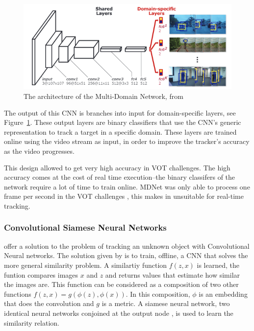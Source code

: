  \begin{figure}[!ht]
    \centering
    \includegraphics[scale=0.5]{MDNet.png}
    \caption{The architecture of the Multi-Domain Network, from \protect\cite{CNNTracking}}
    \label{fig:mdnet}
  \end{figure}
  The output of this CNN is branches into input for domain-specific layers, see Figure~\ref{fig:mdnet}.
  These output layers are binary classifiers that use the CNN's generic representation to track a target in a specific domain.
  These layers are trained online using the video stream as input, in order to improve the tracker's accuracy as the video progresses.

  This design allowed \citeauthor{CNNTracking} to get very high accuracy in VOT challenges.
  The high accuracy comes at the cost of real time execution--the binary classifers of the network require a lot of time to train online.
  MDNet was only able to process one frame per second in the VOT challenges \cite{bertinetto2016}, this makes in unsuitable for real-time tracking.
  

  \subsubsection{Convolutional Siamese Neural Networks}
  \citeauthor{bertinetto2016} \cite{bertinetto2016} offer a solution to the problem of tracking an unknown object with Convolutional Neural networks.
  The solution given by \citeauthor{bertinetto2016} is to train, offline, a CNN that solves the more general similarity problem.
  A similartiy function $f(z,x)$ is learned, the funtion compares images $x$ and $z$ and returns values that estimate how similar the images are.
  This function can be considered as a composition of two other functions $f(z, x) = g(\phi(z), \phi(x))$.
  In this composition, $\phi$ is an embedding that does the convolution and $g$ is a metric.
  A siamese neural network, two identical neural networks conjoined at the output node \cite{bromley1993}, is used to learn the similarity relation.

